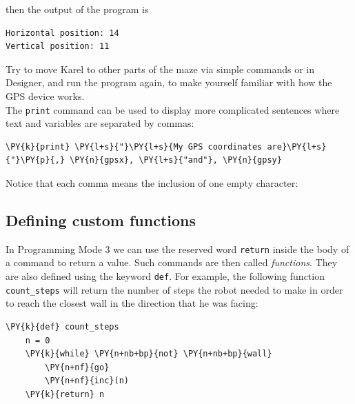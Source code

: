 \noindent
then the output of the program is\\

\begin{ybox}
\begin{verbatim}
Horizontal position: 14
Vertical position: 11
\end{verbatim}
\end{ybox}
\vspace{6mm}

\noindent
Try to move Karel to other parts of the maze via simple commands or in Designer, 
and run the program again, to make yourself familiar with how the GPS device works.\\

\noindent
The {\tt print} command can be used to display more complicated sentences where text
and variables are separated by commas:\\

\begin{bbox}
\begin{Verbatim}[commandchars=\\\{\}]
\PY{k}{print} \PY{l+s}{"}\PY{l+s}{My GPS coordinates are}\PY{l+s}{"}\PY{p}{,} \PY{n}{gpsx}, \PY{l+s}{"and"}, \PY{n}{gpsy}
\end{Verbatim}
\end{bbox}
\vspace{6mm}

\noindent
Notice that each comma means the inclusion of one empty character:


\subsection[\ \ Defining custom functions]{Defining custom functions}

In Programming Mode 3 we can use the reserved word {\tt return} inside the body of
a command to return a value. Such commands are then called {\em functions}. 
They are also defined using the keyword {\tt def}. For example, the following function
{\tt count\_steps} will return the number of steps the robot needed to 
make in order to reach the closest wall in the direction that he was facing:\\

\begin{bbox}
\begin{Verbatim}[commandchars=\\\{\}]
\PY{k}{def} count_steps
    n = 0
    \PY{k}{while} \PY{n+nb+bp}{not} \PY{n+nb+bp}{wall}
        \PY{n+nf}{go}
        \PY{n+nf}{inc}(n)
    \PY{k}{return} n
\end{Verbatim}
\end{bbox}
\vspace{6mm}

